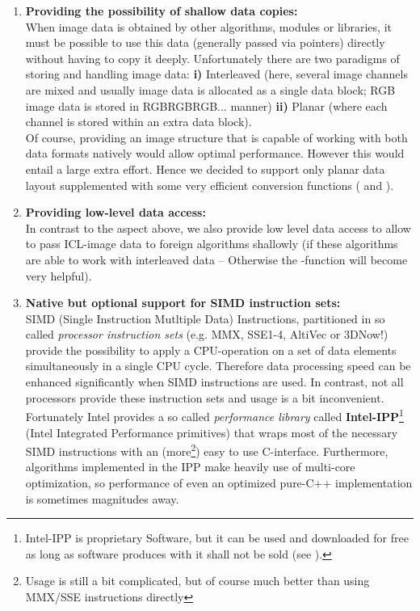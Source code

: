 \begin{enumerate}
\item \textbf{Providing the possibility of shallow data copies:}\\
When image data is obtained by other algorithms, modules or libraries, it must be possible to use this data (generally passed via pointers) directly without having to copy it deeply. Unfortunately there are two paradigms of storing and handling image data: \small{\textbf{i)}} Interleaved (here, several image channels are mixed and usually image data is allocated as a single data block; RGB image data is stored in RGBRGBRGB... manner) \small{\textbf{ii)}} Planar (where each channel is stored within an extra data block).\\
Of course, providing an image structure that is capable of working with both data formats natively would allow optimal performance. However this would entail a large extra effort. Hence we decided to support only planar data layout supplemented with some very efficient conversion functions ( and  ).
\item \textbf{Providing low-level data access:}\\
In contrast to the aspect above, we also provide low level data access to allow to pass ICL-image data to foreign algorithms shallowly (if these algorithms are able to work with interleaved data -- Otherwise the -function will become very helpful).
\item \textbf{Native but optional support for SIMD instruction sets:}\\
SIMD (Single Instruction Mutltiple Data) Instructions, partitioned in so called \emph{processor instruction sets} (e.g. MMX, SSE1-4, AltiVec or 3DNow!) provide the possibility to apply a CPU-operation on a set of data elements simultaneously in a single CPU cycle. Therefore data processing speed can be enhanced significantly when SIMD instructions are used. In contrast, not all processors provide these instruction sets and usage is a bit inconvenient.\\
Fortunately Intel provides a so called \emph{performance library} called \textbf{Intel-IPP}\footnote{Intel-IPP is proprietary Software, but it can be used and downloaded  for free as long as software produces with it shall not be sold (see ).} (Intel Integrated Performance primitives) that wraps most of the necessary SIMD instructions with an (more\footnote{Usage is still a bit complicated, but of course much better than using MMX/SSE instructions directly}) easy to use C-interface. Furthermore, algorithms implemented in the IPP make heavily use of multi-core optimization, so performance of even an optimized pure-C++ implementation is sometimes magnitudes away.\\

\end{enumerate}

